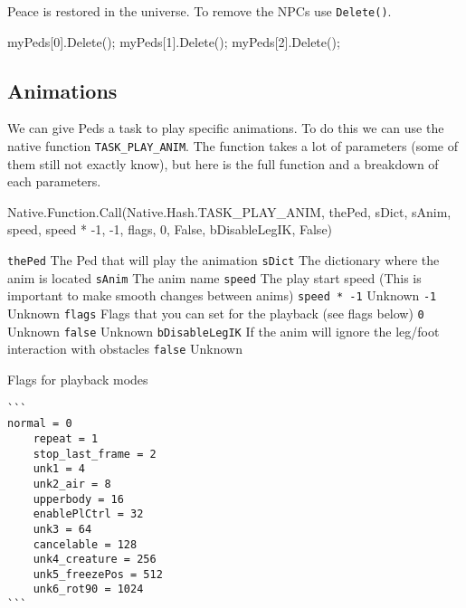 \documentclass[
  openany]{book}
\newenvironment{Shaded}{\begin{snugshade}}{\end{snugshade}}
\newcommand{\DecValTok}[1]{\textcolor[rgb]{0.00,0.00,0.81}{#1}}
\newcommand{\FunctionTok}[1]{\textcolor[rgb]{0.00,0.00,0.00}{#1}}
\newcommand{\NormalTok}[1]{#1}
\begin{document}
Peace is restored in the universe. To remove the NPCs use \texttt{Delete()}.

\begin{Shaded}
\begin{Highlighting}[]
\NormalTok{myPeds[}\DecValTok{0}\NormalTok{].}\FunctionTok{Delete}\NormalTok{();}
\NormalTok{myPeds[}\DecValTok{1}\NormalTok{].}\FunctionTok{Delete}\NormalTok{();}
\NormalTok{myPeds[}\DecValTok{2}\NormalTok{].}\FunctionTok{Delete}\NormalTok{();}
\end{Highlighting}
\end{Shaded}

\hypertarget{animations}{%
\subsection*{Animations}\label{animations}}

We can give Peds a task to play specific animations. To do this we can use the native function \texttt{TASK\_PLAY\_ANIM}.
The function takes a lot of parameters (some of them still not exactly know), but here is the full function and a breakdown of each parameters.

\begin{Shaded}
\begin{Highlighting}[]
\NormalTok{Native.}\FunctionTok{Function}\NormalTok{.}\FunctionTok{Call}\NormalTok{(Native.}\FunctionTok{Hash}\NormalTok{.}\FunctionTok{TASK_PLAY_ANIM}\NormalTok{, thePed, sDict, sAnim, speed, speed * }\DecValTok{-1}\NormalTok{, }\DecValTok{-1}\NormalTok{, flags, }\DecValTok{0}\NormalTok{, False, bDisableLegIK, False) }
\end{Highlighting}
\end{Shaded}

\texttt{thePed} The Ped that will play the animation
\texttt{sDict} The dictionary where the anim is located
\texttt{sAnim} The anim name
\texttt{speed} The play start speed (This is important to make smooth changes between anims)
\texttt{speed\ *\ -1} Unknown
\texttt{-1} Unknown
\texttt{flags} Flags that you can set for the playback (see flags below)
\texttt{0} Unknown
\texttt{false} Unknown
\texttt{bDisableLegIK} If the anim will ignore the leg/foot interaction with obstacles
\texttt{false} Unknown

Flags for playback modes

\begin{verbatim}
```
normal = 0
    repeat = 1
    stop_last_frame = 2
    unk1 = 4
    unk2_air = 8
    upperbody = 16
    enablePlCtrl = 32
    unk3 = 64
    cancelable = 128
    unk4_creature = 256
    unk5_freezePos = 512
    unk6_rot90 = 1024
```
\end{verbatim}
\end{document}

